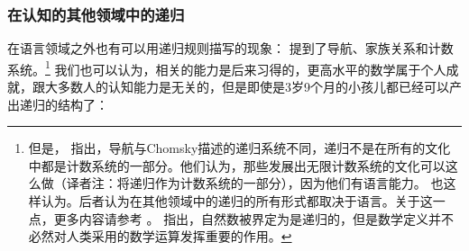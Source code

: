 \subsubsection{在认知的其他领域中的递归}

在语言领域之外也有可以用递归规则描写的现象： \citet*[]{HCF2002a}提到了导航、家族关系和计数系统。\footnote{\label{fn-Rekursion-Mathematik}%
但是， \citet[]{PJ2005a}指出，导航与Chomsky描述的递归系统不同，递归不是在所有的文化中都是计数系统的一部分。他们认为，那些发展出无限计数系统的文化可以这么做（译者注：将递归作为计数系统的一部分），因为他们有语言能力。 \citet*[]{FHC2005a}也这样认为。后者认为在其他领域中的递归的所有形式都取决于语言。关于这一点，更多内容请参考 。 \citet{LL2011a}指出，自然数被界定为是递归的，但是数学定义并不必然对人类采用的数学运算发挥重要的作用。
}
我们也可以认为，相关的能力是后来习得的，更高水平的数学属于个人成就，跟大多数人的认知能力是无关的，但是即使是3岁9个月的小孩儿都已经可以产出递归的结构了：
